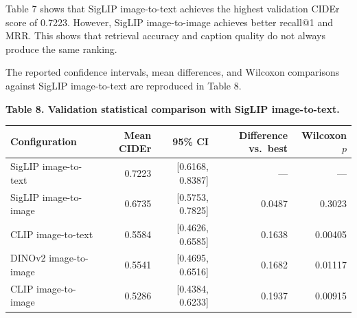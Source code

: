\documentclass{article}
\begin{document}
\begin{table}[htbp]
\centering
{}
\end{table}

Table 7 shows that SigLIP image-to-text achieves the highest
validation CIDEr score of 0.7223. However, SigLIP image-to-image
achieves better recall@1 and MRR. This shows that retrieval
accuracy and caption quality do not always produce the same ranking.

The reported confidence intervals, mean differences, and Wilcoxon
comparisons against SigLIP image-to-text are reproduced in Table 8.

\begin{center}
\textbf{Table 8. Validation statistical comparison with SigLIP
image-to-text.}
\end{center}

\begin{table}[htbp]
\centering
\begin{tabular}{lrrrr}
\toprule
Configuration & Mean CIDEr & 95\% CI & Difference vs.\ best & Wilcoxon \(p\) \\
\midrule
SigLIP image-to-text & 0.7223 & [0.6168, 0.8387] & --- & --- \\
SigLIP image-to-image & 0.6735 & [0.5753, 0.7825] & 0.0487 & 0.3023 \\
CLIP image-to-text & 0.5584 & [0.4626, 0.6585] & 0.1638 & 0.00405 \\
DINOv2 image-to-image & 0.5541 & [0.4695, 0.6516] & 0.1682 & 0.01117 \\
CLIP image-to-image & 0.5286 & [0.4384, 0.6233] & 0.1937 & 0.00915 \\
\bottomrule
\end{tabular}
\end{table}
\end{document}
